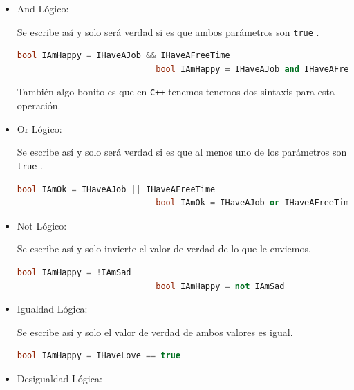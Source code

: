 \documentclass[12pt, fleqn]{report}                             %
\theoremstyle{break}                                            %
\newcommand{\textCode}[1]  { \texttt{#1} }                      %
\newcommand \Cpp  {\textCode{C++} }                               %
\begin{document}
                \begin{itemize}
                    \item And Lógico: 
                    
                        Se escribe así y solo será verdad si es que ambos parámetros son \textCode{true}.
                        \begin{lstlisting}[language=C++, gobble=28]
                            bool IAmHappy = IHaveAJob && IHaveAFreeTime 
                            bool IAmHappy = IHaveAJob and IHaveAFreeTime
                        \end{lstlisting}

                        También algo bonito es que en \Cpp tenemos tenemos dos sintaxis para esta operación.

                    \item Or Lógico: 
                    
                        Se escribe así y solo será verdad si es que al menos uno de los parámetros son \textCode{true}.
                        \begin{lstlisting}[language=C++, gobble=28]
                            bool IAmOk = IHaveAJob || IHaveAFreeTime 
                            bool IAmOk = IHaveAJob or IHaveAFreeTime
                        \end{lstlisting}

                    \item Not Lógico: 
                    
                        Se escribe así y solo invierte el valor de verdad de lo que le enviemos.
                        \begin{lstlisting}[language=C++, gobble=28]
                            bool IAmHappy = !IAmSad
                            bool IAmHappy = not IAmSad
                        \end{lstlisting}

                    \item Igualdad Lógica: 
                    
                        Se escribe así y solo el valor de verdad de ambos valores es igual.
                        \begin{lstlisting}[language=C++, gobble=28]
                            bool IAmHappy = IHaveLove == true
                        \end{lstlisting}
                    
                    \item Desigualdad Lógica: 
                    

\end{itemize}
\end{document}
